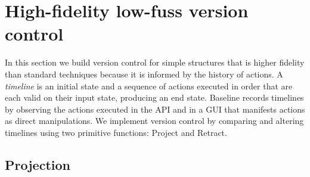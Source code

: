 \documentclass[english,submission]{programming}
\theoremstyle{definition}
\begin{document}
\section{High-fidelity low-fuss version control}
In this section we build version control for simple structures that is higher fidelity than standard techniques because it is informed by the history of actions.
A \textit{timeline} is an initial state and a sequence of actions executed in order that are each valid on their input state, producing an end state. Baseline records timelines by observing the actions executed in the API and in a GUI that manifests actions as direct manipulations.
We implement version control by comparing and altering timelines using two primitive functions: \textsf{Project} and \textsf{Retract}.

\subsection{Projection}
\end{document}
